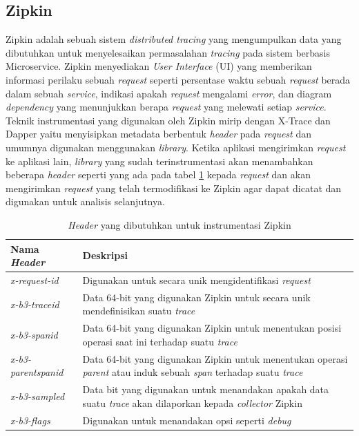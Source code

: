
\subsection{Zipkin}

Zipkin \citep{zipkin} adalah sebuah sistem \textit{distributed tracing} yang mengumpulkan data yang dibutuhkan untuk menyelesaikan permasalahan \textit{tracing} pada sistem berbasis Microservice. Zipkin menyediakan \textit{User Interface} (UI) yang memberikan informasi perilaku sebuah \textit{request} seperti persentase waktu sebuah \textit{request} berada dalam sebuah \textit{service}, indikasi apakah \textit{request} mengalami \textit{error}, dan diagram \textit{dependency} yang menunjukkan berapa \textit{request} yang melewati setiap \textit{service}. Teknik instrumentasi yang digunakan oleh Zipkin mirip dengan X-Trace dan Dapper yaitu menyisipkan metadata berbentuk \textit{header} pada \textit{request} dan umumnya digunakan menggunakan \textit{library}. Ketika aplikasi mengirimkan \textit{request} ke aplikasi lain, \textit{library} yang sudah terinstrumentasi akan menambahkan beberapa \textit{header} seperti yang ada pada tabel \ref{zipkin-tab} kepada \textit{request} dan akan mengirimkan \textit{request} yang telah termodifikasi ke Zipkin agar dapat dicatat dan digunakan untuk analisis selanjutnya.
\begin{small}
	\begin{longtable}{ | p{3cm} | p{10cm} |}
		\caption{\textit{Header} yang dibutuhkan untuk instrumentasi Zipkin}
		\label{zipkin-tab}                                                           
		\\ \hline
		\centering\bfseries{Nama \textit{Header}} & \centering\bfseries{Deskripsi} \tabularnewline \hline
		\endfirsthead
		\textit{x-request-id} & Digunakan untuk secara unik mengidentifikasi \textit{request} \\ \hline
		\textit{x-b3-traceid} & Data 64-bit yang digunakan Zipkin untuk secara unik mendefinisikan suatu \textit{trace} \\ \hline
		\textit{x-b3-spanid} & Data 64-bit yang digunakan Zipkin untuk menentukan posisi operasi saat ini terhadap suatu \textit{trace} \\ \hline
		\textit{x-b3-parentspanid} & Data 64-bit yang digunakan Zipkin untuk menentukan operasi \textit{parent} atau induk sebuah \textit{span} terhadap suatu \textit{trace} \\ \hline
		\textit{x-b3-sampled} & Data bit yang digunakan untuk menandakan apakah data suatu \textit{trace} akan dilaporkan kepada \textit{collector} Zipkin \\ \hline
		\textit{x-b3-flags} & Digunakan untuk menandakan opsi seperti \textit{debug} \\ \hline
	\end{longtable}
\end{small}

